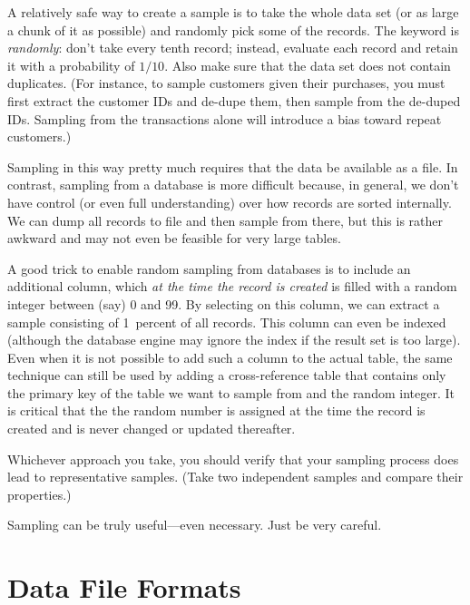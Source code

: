 A relatively safe way to create a sample is to take the whole data set
(or as large a chunk of it as possible) and randomly pick some of the
records. The keyword is \emph{randomly}: don't take every tenth
record; instead, evaluate each record and retain it with a probability of 
$1/10$. Also make sure that the data set does not contain duplicates.
(For instance, to sample customers given their purchases, you must
first extract the customer IDs and de-dupe them, then sample from the
de-duped IDs. Sampling from the transactions alone will introduce a
bias toward repeat customers.)

\spreadlong{-13pt}

Sampling in this way pretty much requires that the data be available
as a file. In contrast, sampling from a database is more difficult
because, in general, we don't have control (or even full understanding)
over how records are sorted internally. We can dump all records to
file and then sample from there, but this is rather awkward and may
not even be feasible for very large tables.

A good trick to enable random sampling from databases is to include an
additional column, which \emph{at the time the record is created} is
filled with a random integer between (say) 0 and 99. By selecting on
this column, we can extract a sample consisting of 1~percent of all
records. This column can even be indexed (although the database engine
may ignore the index if the result set is too large). Even when it is
not possible to add such a column to the actual table, the same
technique can still be used by adding a cross-reference table that
contains only the primary key of the table we want to sample from and
the random integer. It is critical that the the random number is
assigned at the time the record is created and is never changed or
updated thereafter.

Whichever approach you take, you should verify that your sampling
process does lead to representative samples. (Take two independent
samples and compare their properties.)

Sampling can be truly useful---even necessary. Just be very careful.

\section{Data File Formats}


